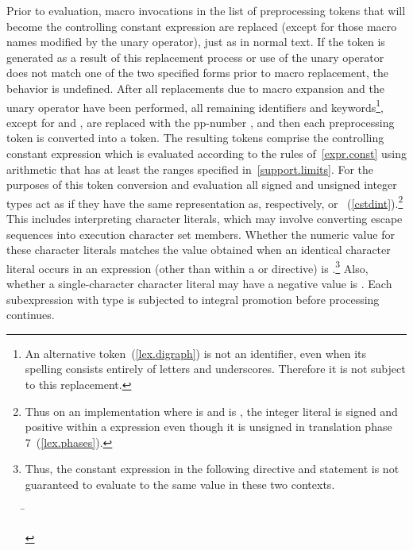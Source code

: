 \pnum
Prior to evaluation,
macro invocations in the list of preprocessing tokens
that will become the controlling constant expression
are replaced
(except for those macro names modified by the
unary operator),
just as in normal text.
If the token
is generated as a result of this replacement process
or use of the
unary operator does not match one of the two specified forms
prior to macro replacement,
the behavior is undefined.
After all replacements due to macro expansion and the
unary operator have been performed,
all remaining identifiers and keywords\footnote{An alternative
token~(\ref{lex.digraph}) is not an identifier,
even when its spelling consists entirely of letters and underscores.
Therefore it is not subject to this replacement.},
except for
and
,
are replaced with the pp-number
,
and then each preprocessing token is converted into a token.
The resulting tokens comprise the controlling constant expression
which is evaluated according to the rules of~\ref{expr.const}
using arithmetic that has at least the ranges specified
in~\ref{support.limits}. For the purposes of this token conversion and evaluation
all signed and unsigned integer types
act as if they have the same representation as, respectively,
 or ~(\ref{cstdint}).\footnote{Thus on an
implementation where  is 
and  is ,
the integer literal  is signed and positive within a 
expression even though it is unsigned in translation phase
7~(\ref{lex.phases}).}
This includes interpreting character literals, which may involve
converting escape sequences into execution character set members.
Whether the numeric value for these character literals
matches the value obtained when an identical character literal
occurs in an expression
(other than within a
or
directive)
is .\footnote{Thus, the constant expression in the following
directive and
statement is not guaranteed to evaluate to the same value in these two
contexts.
\begin{tabbing}
\hspace{.6in}\=\kill%
\>\\
\>
\end{tabbing}
}
Also, whether a single-character character literal may have a negative
value is .
Each subexpression with type
is subjected to integral promotion before processing continues.

